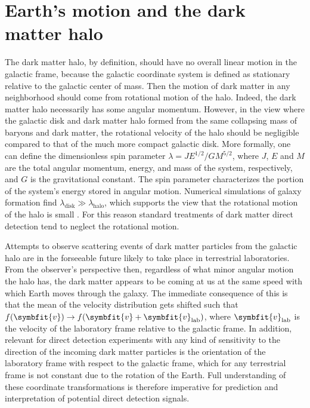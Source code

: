 \documentclass[b5paper, 10pt, twoside]{book}
\renewcommand{\vec}[1]{\symbfit{#1}}
\begin{document}
\section{Earth's motion and the dark matter halo}

The dark matter halo, by definition, should have no overall linear motion in the galactic frame, because the galactic coordinate system is defined as stationary relative to the galactic center of mass. Then the motion of dark matter in any neighborhood should come from rotational motion of the halo. Indeed, the dark matter halo necessarily has some angular momentum. However, in the view where the galactic disk and dark matter halo formed from the same collapsing mass of baryons and dark matter, the rotational velocity of the halo should be negligible compared to that of the much more compact galactic disk. More formally, one can define the dimensionless spin parameter $\lambda=JE^{1/2}/GM^{5/2}$, where $J$, $E$ and $M$ are the total angular momentum, energy, and mass of the system, respectively, and $G$ is the gravitational constant. The spin parameter characterizes the portion of the system's energy stored in angular motion. Numerical simulations of galaxy formation find $\lambda_\text{disk}\gg\lambda_\text{halo}$, which supports the view that the rotational motion of the halo is small \parencites{MoMaoWhite1998, WarrenEtAl1992, KimmEtAl2011}. For this reason standard treatments of dark matter direct detection tend to neglect the rotational motion.

Attempts to observe scattering events of dark matter particles from the galactic halo are in the forseeable future likely to take place in terrestrial laboratories. From the observer's perspective then, regardless of what minor angular motion the halo has, the dark matter appears to be coming at us at the same speed with which Earth moves through the galaxy. The immediate consequence of this is that the mean of the velocity distribution gets shifted such that $f(\vec{v})\rightarrow f(\vec{v}+\vec{v}_\text{lab})$, where $\vec{v}_\text{lab}$ is the velocity of the laboratory frame relative to the galactic frame. In addition, relevant for direct detection experiments with any kind of sensitivity to the direction of the incoming dark matter particles is the orientation of the laboratory frame with respect to the galactic frame, which for any terrestrial frame is not constant due to the rotation of the Earth. Full understanding of these coordinate transformations is therefore imperative for prediction and interpretation of potential direct detection signals.
\end{document}

